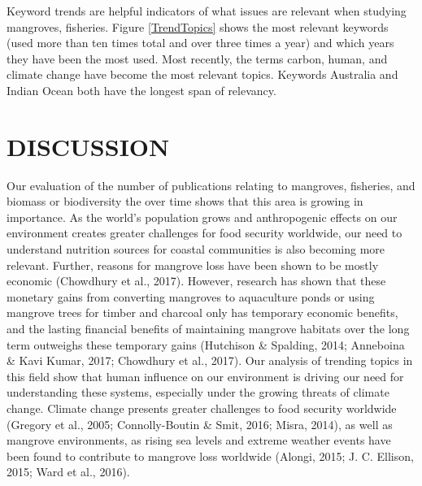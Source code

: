 \documentclass[
  12pt,
]{article}
\begin{document}
Keyword trends are helpful indicators of what issues are relevant when studying mangroves, fisheries. Figure \ref{TrendTopics} shows the most relevant keywords (used more than ten times total and over three times a year) and which years they have been the most used. Most recently, the terms carbon, human, and climate change have become the most relevant topics. Keywords Australia and Indian Ocean both have the longest span of relevancy.

\section{DISCUSSION}\label{discussion}

Our evaluation of the number of publications relating to mangroves, fisheries, and biomass or biodiversity the over time shows that this area is growing in importance. As the world's population grows and anthropogenic effects on our environment creates greater challenges for food security worldwide, our need to understand nutrition sources for coastal communities is also becoming more relevant. Further, reasons for mangrove loss have been shown to be mostly economic (Chowdhury et al., 2017). However, research has shown that these monetary gains from converting mangroves to aquaculture ponds or using mangrove trees for timber and charcoal only has temporary economic benefits, and the lasting financial benefits of maintaining mangrove habitats over the long term outweighs these temporary gains (Hutchison \& Spalding, 2014; Anneboina \& Kavi Kumar, 2017; Chowdhury et al., 2017). Our analysis of trending topics in this field show that human influence on our environment is driving our need for understanding these systems, especially under the growing threats of climate change. Climate change presents greater challenges to food security worldwide (Gregory et al., 2005; Connolly-Boutin \& Smit, 2016; Misra, 2014), as well as mangrove environments, as rising sea levels and extreme weather events have been found to contribute to mangrove loss worldwide (Alongi, 2015; J. C. Ellison, 2015; Ward et al., 2016).
\end{document}
